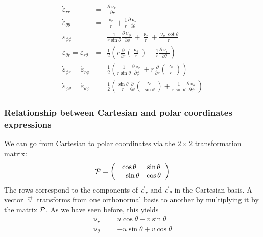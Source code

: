 \begin{eqnarray}
\dot\varepsilon_{rr} 
&=& \frac{\partial \upnu_r}{\partial r} \\
\dot\varepsilon_{\theta\theta} 
&=& \frac{\upnu_r}{r} + \frac{1}{r} \frac{\partial \upnu_\theta}{\partial \theta}  \\
\dot\varepsilon_{\phi\phi} 
&=& \frac{1}{r \sin\theta} \frac{\partial \upnu_\phi}{\partial \phi} +
\frac{\upnu_r}{r} +\frac{\upnu_\theta \cot \theta}{r} \\
\dot\varepsilon_{\theta r} = \dot\varepsilon_{r\theta}   
&=& \frac{1}{2} \left( r \frac{\partial}{\partial r} (\frac{\upnu_\theta}{r} ) 
+\frac{1}{r} \frac{\partial \upnu_r}{\partial \theta} \right) \\
\dot\varepsilon_{\phi r} = \dot\varepsilon_{r\phi}      
&=&  \frac{1}{2} \left(  \frac{1}{r \sin\theta} \frac{\partial \upnu_r}{\partial \phi} 
+ r \frac{\partial }{\partial r} (\frac{\upnu_\phi}{r}) \right)  \\
\dot\varepsilon_{\phi \theta} = \dot\varepsilon_{\theta\phi} 
&=& \frac{1}{2} \left( \frac{\sin \theta}{r} \frac{\partial }{\partial \theta} (\frac{\upnu_\phi}{\sin\theta}) + \frac{1}{r \sin\theta} \frac{\partial \upnu_\theta}{\partial \phi}    \right) 
\end{eqnarray}


\subsubsection{Relationship between Cartesian and polar coordinates expressions}

We can go from Cartesian to polar coordinates  via the $2\times 2$ transformation matrix:
\begin{equation}
{\cal P}=
\left(
\begin{array}{ccc}
\cos\theta & \sin\theta \\
-\sin\theta & \cos\theta
\end{array}
\right)
\end{equation}
The rows correspond to the components of $\vec{e}_r$ and $\vec{e}_\theta$ in the Cartesian basis.
A vector $\vec{\upnu}$ transforms from one orthonormal basis to another by multiplying it by 
the matrix ${\cal P}$. As we have seen before, this yields
\begin{eqnarray}
\upnu_r &=& u \cos\theta + v \sin\theta \\
\upnu_\theta &=& -u \sin\theta + v \cos\theta
\end{eqnarray}

